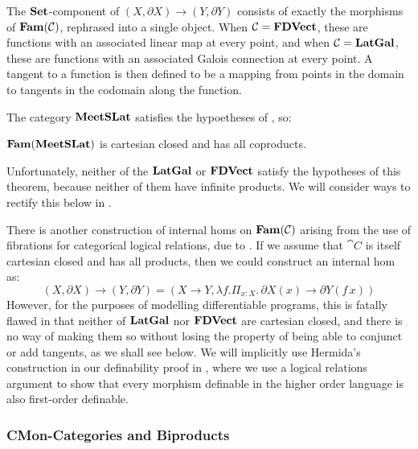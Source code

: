 The $\mathbf{Set}$-component of $(X, \partial X) \to (Y, \partial Y)$ consists
of exactly the morphisms of $\mathbf{Fam}(\mathcal{C})$, rephrased into a single
object. When $\mathcal{C} = \mathbf{FDVect}$, these are functions with an
associated linear map at every point, and when $\mathcal{C} = \mathbf{LatGal}$,
these are functions with an associated Galois connection at every
point. A tangent to a function is then defined to be a mapping from
points in the domain to tangents in the codomain along the function.

The category $\mathbf{MeetSLat}$ satisfies the hypoetheses of
, so:
\begin{corollary}
  $\mathbf{Fam}(\mathbf{MeetSLat})$ is cartesian closed and has all coproducts.
\end{corollary}
Unfortunately, neither of the $\mathbf{LatGal}$ or $\mathbf{FDVect}$ satisfy the
hypotheses of this theorem, because neither of them have infinite
products. We will consider ways to rectify this below in
.

\begin{remark}
  \label{rem:hermida-exponentials}
  There is another construction of internal homs on $\mathbf{Fam}(\mathcal{C})$
  arising from the use of fibrations for categorical logical
  relations, due to \citet[Corollary 4.12]{hermida99}. If we assume
  that $\cat{C}$ is itself cartesian closed and has all products, then
  we could construct an internal hom as:
  \begin{displaymath}
    (X, \partial X) \to (Y, \partial Y) = (X \to Y, \lambda f. \Pi_{x : X}.\,\partial X(x) \to \partial Y(f\,x))
  \end{displaymath}
  However, for the purposes of modelling differentiable programs, this
  is fatally flawed in that neither of $\mathbf{LatGal}$ nor $\mathbf{FDVect}$ are
  cartesian closed, and there is no way of making them so without
  losing the property of being able to conjunct or add tangents, as we
  shall see below. We will implicitly use Hermida's construction in
  our definability proof in , where we use a
  logical relations argument to show that every morphism definable in
  the higher order language is also first-order definable.
\end{remark}

\subsubsection{CMon-Categories and Biproducts}
\label{sec:biproducts}

